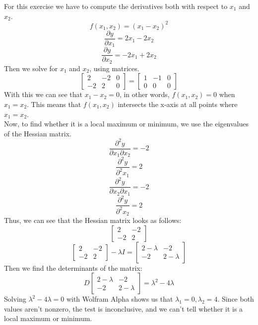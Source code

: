 For this exercise we have to compute the derivatives both with respect to $x_1$ and $x_2$.
$$f(x_1,x_2) = (x_1-x_2)^2$$
$$\frac{\partial y}{\partial x_1} = 2x_1-2x_2$$
$$\frac{\partial y}{\partial x_2} = -2x_1+2x_2$$
Then we solve for $x_1$ and $x_2$, using matrices.
$$
\left[
\begin{array}{rr|r}
2 & -2 & 0\\
-2 & 2 & 0
\end{array}
\right]
=
\left[
\begin{array}{rr|r}
1 & -1 & 0\\
0 & 0 & 0
\end{array}
\right]
$$
With this we can see that $x_1-x_2=0$, in other words, $f(x_1,x_2) = 0$ when $x_1 = x_2$. This means that $f(x_1,x_2)$ intersects the x-axis at all points where $x_1 = x_2$.\\
Now, to find whether it is a local maximum or minimum, we use the eigenvalues of the Hessian matrix.
$$\frac{\partial^2 y}{\partial x_1 \partial x_2} = -2$$
$$\frac{\partial^2 y}{\partial^2 x_1} = 2$$
$$\frac{\partial^2 y}{\partial x_2 \partial x_1} = -2$$
$$\frac{\partial^2 y}{\partial^2 x_2} = 2$$
Thus, we can see that the Hessian matrix looks as follows:
$$
\left[
\begin{array}{rr}
2 & -2\\
-2 & 2
\end{array}
\right]
$$
$$
\left[
\begin{array}{rr}
2 & -2\\
-2 & 2
\end{array}
\right]
-\lambda I
=
\left[
\begin{array}{rr}
2-\lambda & -2\\
-2 & 2-\lambda
\end{array}
\right]
$$
Then we find the determinants of the matrix:
$$
D
\left[
\begin{array}{rr}
2-\lambda & -2\\
-2 & 2-\lambda
\end{array}
\right]
= \lambda^2-4\lambda
$$
Solving $\lambda^2-4\lambda = 0$ with Wolfram Alpha shows us that $\lambda_1 = 0, \lambda_2 = 4$. Since both values aren't nonzero, the test is inconclusive, and we can't tell whether it is a local maximum or minimum.